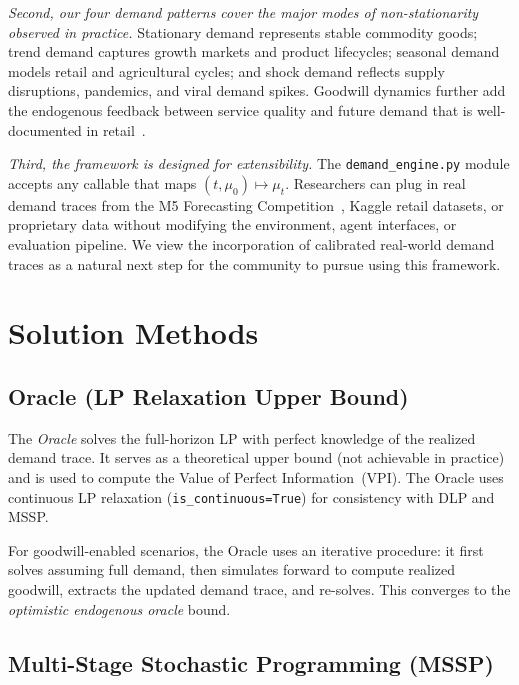 \documentclass[preprint,12pt]{elsarticle}
\begin{document}
\emph{Second, our four demand patterns cover the major modes of
non-stationarity observed in practice.} Stationary demand represents
stable commodity goods; trend demand captures growth markets and
product lifecycles; seasonal demand models retail and agricultural
cycles; and shock demand reflects supply disruptions, pandemics, and
viral demand spikes. Goodwill dynamics further add the endogenous
feedback between service quality and future demand that is well-documented
in retail~\citep{anderson2004customer}.

\emph{Third, the framework is designed for extensibility.} The
\texttt{demand\_engine.py} module accepts any callable that maps
$(t, \mu_0) \mapsto \mu_t$. Researchers can plug in real demand traces
from the M5 Forecasting Competition~\citep{makridakis2022m5}, Kaggle
retail datasets, or proprietary data without modifying the environment,
agent interfaces, or evaluation pipeline. We view the incorporation of
calibrated real-world demand traces as a natural next step for the
community to pursue using this framework.


\section{Solution Methods}\label{sec:methods}

\subsection{Oracle (LP Relaxation Upper Bound)}

The \emph{Oracle} solves the full-horizon LP with perfect knowledge of the
realized demand trace. It serves as a theoretical upper bound
(not achievable in practice) and is used to compute the Value of Perfect
Information~(VPI). The Oracle uses continuous LP relaxation
(\texttt{is\_continuous=True}) for consistency with DLP and MSSP.

For goodwill-enabled scenarios, the Oracle uses an iterative procedure:
it first solves assuming full demand, then simulates forward to compute
realized goodwill, extracts the updated demand trace, and re-solves.
This converges to the \emph{optimistic endogenous oracle} bound.

\subsection{Multi-Stage Stochastic Programming (MSSP)}
\end{document}
